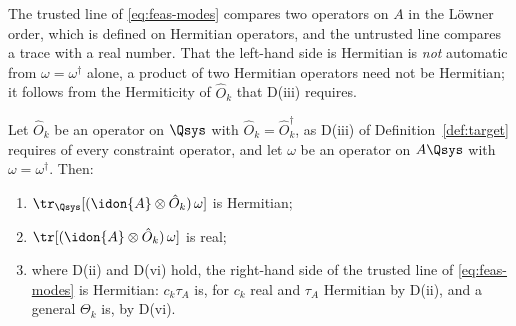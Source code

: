 
The trusted line of \eqref{eq:feas-modes} compares two operators on $A$ in
the L\"owner order, which is defined on Hermitian operators, and the untrusted
line compares a trace with a real number. That the left-hand side is
Hermitian is \emph{not} automatic from $\omega=\omega^{\dagger}$ alone, a
product of two Hermitian operators need not be Hermitian; it follows from the
Hermiticity of $\hat O_k$ that D(iii) requires.

\begin{lemma}\label{lem:hermitian-constraint-values}
Let $\hat O_k$ be an operator on $\Qsys$ with
$\hat O_k=\hat O_k^{\dagger}$, as D(iii) of Definition~\ref{def:target}
requires of every constraint operator, and let $\omega$ be an operator on
$A\Qsys$ with
$\omega=\omega^{\dagger}$. Then:
\begin{enumerate}[label=(\roman*),leftmargin=2.4em]
\item $\tr_{\Qsys}[(\idon{A}\otimes\hat O_k)\,\omega]$ is Hermitian;
\item $\tr[(\idon{A}\otimes\hat O_k)\,\omega]$ is real;
\item where D(ii) and D(vi) hold, the right-hand side of the trusted line of
  \eqref{eq:feas-modes} is Hermitian: $c_k\tau_A$ is, for $c_k$ real and
  $\tau_A$ Hermitian by D(ii), and a general $\Theta_k$ is, by D(vi).
\end{enumerate}
\end{lemma}

